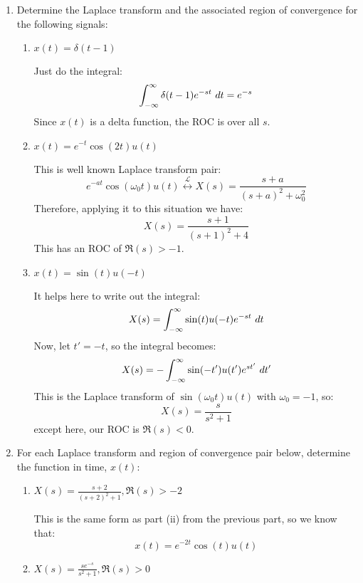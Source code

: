 \documentclass[10pt]{article}
\begin{document}
	\begin{enumerate}[label=\alph*)]
		\item Determine the Laplace transform and the associated region of convergence for the following signals:
			\begin{enumerate}[label=\roman*)]
				\item \( x(t) = \delta(t - 1) \) 

					\begin{solution}
						Just do the integral:
						\[
						\int_{-\infty}^{\infty} \delta(t - 1)e^{-st} \ d t = e^{-s}
						\] 
						Since \( x(t) \) is a delta function, the ROC is over all \( s \).
					\end{solution}
				\item \( x(t) = e^{-t}\cos(2t)u(t) \) 

					\begin{solution}
						This is well known Laplace transform pair:
						\[
							e^{-at}\cos(\omega_0t)u(t) \overset{\mathcal L}{\longleftrightarrow}
							X(s) = \frac{s + a}{(s + a)^2 + \omega_0^2}
						\] 
						Therefore, applying it to this situation we have:  
						\[
						X(s) = \frac{s + 1}{(s + 1)^2 + 4}
						\] 
						This has an ROC of \( \Re(s) > -1 \). 
					\end{solution}
				\item \( x(t) = \sin(t) u(-t) \) 

					\begin{solution}
						It helps here to write out the integral:
						\[
							X(s) = \int_{-\infty}^{\infty} \sin(t) u(-t) e^{-st} \ d t 
						\] 
						Now, let \( t' = -t \), so the integral becomes:
						\[
						X(s) = -\int_{-\infty}^{\infty} \sin(-t') u(t') e^{st'} \ d t'
						\] 
						This is the Laplace transform of \( \sin(\omega_0 t)u(t) \) with \( \omega_0 = -1 \), 
						so:
						\[
						X(s) = \frac{s}{s^2 + 1}
						\] 
						except here, our ROC is \( \Re(s) < 0 \). 
					\end{solution}
			\end{enumerate}
		\item For each Laplace transform and region of convergence pair below, determine the function 
			in time, \( x(t) \):
			\begin{enumerate}[label=\alph*)]
				\item \( X(s) = \frac{s + 2}{(s+2)^2 + 1}, \Re(s) > -2 \) 

					\begin{solution}
						This is the same form as part (ii) from the previous part, so 
						we know that:
						\[
						x(t) = e^{-2t}\cos(t) u(t)
						\] 
					\end{solution}
				\item \( X(s) = \frac{s e^{-s}}{s^2 + 1}, \Re(s) > 0 \) 


\end{enumerate}
\end{enumerate}
\end{document}
